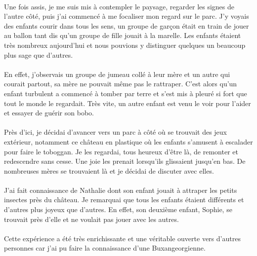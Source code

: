 \paragraph{} Une fois assis, je me suis mis à contempler le paysage, regarder
les signes de l'autre côté, puis j'ai commencé à me focaliser mon regard sur le
parc. J'y voyais des enfants courir dans tous les sens, un groupe de garçon
était en train de jouer au ballon tant dis qu'un groupe de fille jouait à la
marelle. Les enfants étaient très nombreux aujourd'hui et nous pouvions y
distinguer quelques un beaucoup plus sage que d'autres.

\paragraph{} En effet, j'observais un groupe de jumeau collé à leur mère et un
autre qui courait partout, sa mère ne pouvait même pas le rattraper. C'est
alors qu'un enfant turbulent a commencé à tomber par terre et s'est mis à
pleuré si fort que tout le monde le regardait. Très vite, un autre enfant est
venu le voir pour l'aider et essayer de guérir son bobo.

\paragraph{} Près d'ici, je décidai d'avancer vers un parc à côté où se
trouvait des jeux extérieur, notamment ce château en plastique où les enfants
s'amusent à escalader pour faire le toboggan. Je les regardai, tous heureux
d'être là, de remonter et redescendre sans cesse. Une joie les prenait
lorsqu'ils glissaient jusqu'en bas. De nombreuses mères se trouvaient là et je
décidai de discuter avec elles.

\paragraph{} J'ai fait connaissance de Nathalie dont son enfant jouait à
attraper les petits insectes près du château. Je remarquai que tous les enfants
étaient différents et d'autres plus joyeux que d'autres. En effet, son deuxième
enfant, Sophie, se trouvait près d'elle et ne voulait pas jouer avec les
autres.

\paragraph{} Cette expérience a été très enrichissante et une véritable ouverte
vers d'autres personnes car j'ai pu faire la connaissance d'une
Buxangeorgienne.

